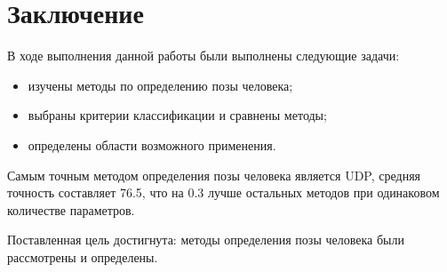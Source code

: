 \chapter*{Заключение}

В ходе выполнения данной работы были выполнены следующие задачи:
\begin{itemize}
	\item изучены методы по определению позы человека;
	\item выбраны критерии классификации и сравнены методы;
	\item определены области возможного применения.
\end{itemize}

Самым точным методом определения позы человека является UDP, средняя точность составляет 76.5, что на 0.3 лучше остальных методов при одинаковом количестве параметров. 

Поставленная цель достигнута: методы определения позы человека были рассмотрены и определены.